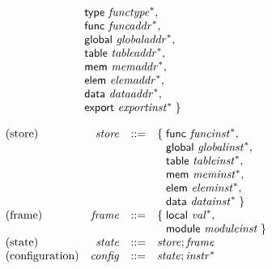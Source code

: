 $$\begin{array}{@{}lrrl@{}l@{}}
\begin{array}[t]{@{}l@{}l@{}}
\mathsf{type}~{{\mathit{functype}}^\ast},\; \\
  \mathsf{func}~{{\mathit{funcaddr}}^\ast},\; \\
  \mathsf{global}~{{\mathit{globaladdr}}^\ast},\; \\
  \mathsf{table}~{{\mathit{tableaddr}}^\ast},\; \\
  \mathsf{mem}~{{\mathit{memaddr}}^\ast},\; \\
  \mathsf{elem}~{{\mathit{elemaddr}}^\ast},\; \\
  \mathsf{data}~{{\mathit{dataaddr}}^\ast},\; \\
  \mathsf{export}~{{\mathit{exportinst}}^\ast} \;\}\end{array} \\
\end{array}
$$

\vspace{1ex}

$$
\begin{array}{@{}lrrl@{}l@{}}
\mbox{(store)} & {\mathit{store}} &::=& \{\; \begin{array}[t]{@{}l@{}l@{}}
\mathsf{func}~{{\mathit{funcinst}}^\ast},\; \\
  \mathsf{global}~{{\mathit{globalinst}}^\ast},\; \\
  \mathsf{table}~{{\mathit{tableinst}}^\ast},\; \\
  \mathsf{mem}~{{\mathit{meminst}}^\ast},\; \\
  \mathsf{elem}~{{\mathit{eleminst}}^\ast},\; \\
  \mathsf{data}~{{\mathit{datainst}}^\ast} \;\}\end{array} \\
\mbox{(frame)} & {\mathit{frame}} &::=& \{\; \begin{array}[t]{@{}l@{}l@{}}
\mathsf{local}~{{\mathit{val}}^\ast},\; \\
  \mathsf{module}~{\mathit{moduleinst}} \;\}\end{array} \\
\mbox{(state)} & {\mathit{state}} &::=& {\mathit{store}} ; {\mathit{frame}} \\
\mbox{(configuration)} & {\mathit{config}} &::=& {\mathit{state}} ; {{\mathit{instr}}^\ast} \\
\end{array}
$$

\vspace{1ex}


